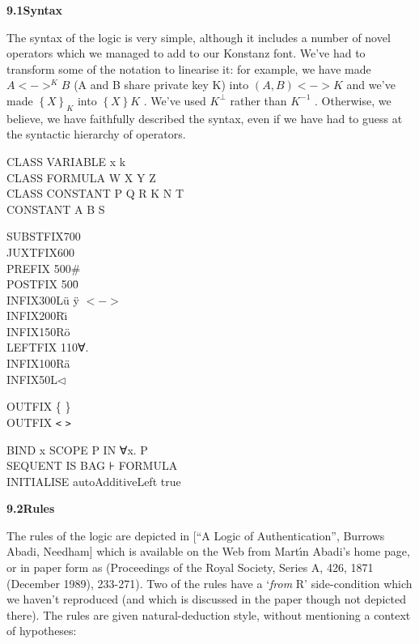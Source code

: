 \documentclass[11pt]{book}
\newcommand{\tab}{\hspace{5mm}}
\begin{document}
\textbf{{\large 9.1\tab Syntax}}


The syntax of the logic is very simple, although it includes a number of novel operators which we managed to add to our Konstanz font. We've had to transform some of the notation to linearise it: for example, we have made $A<->^{K} B$ (A and B share private key K) into $\left( A,B\right) <->K$ and we've made $\left\{ X\right\} _{K} $ into $\left\{ X\right\} K$ . We've used $K^{\bot } $ rather than $K^{-1} $ . Otherwise, we believe, we have faithfully described the syntax, even if we have had to guess at the syntactic hierarchy of operators.

CLASS VARIABLE x k\\
CLASS FORMULA W X Y Z\\
CLASS CONSTANT P Q R K N T\\
CONSTANT A B S

SUBSTFIX\tab 700\\
JUXTFIX\tab 600\\
PREFIX \tab 500\tab \#\\
POSTFIX \tab 500\tab \={}\\
INFIX\tab 300L\tab \"{u} \"{y} $<->$\\
INFIX\tab 200R\tab \"{\i}\\
INFIX\tab 150R\tab \"{o}\\
LEFTFIX \tab 110\tab ∀.\\
INFIX\tab 100R\tab \"{a}\\
INFIX\tab 50L\tab $\triangleleft$

OUTFIX \{ \}\\
OUTFIX \texttt{<} \texttt{>}

BIND x SCOPE P IN ∀x. P\\
SEQUENT IS BAG ⊦ FORMULA\\
INITIALISE autoAdditiveLeft true


\textbf{{\large 9.2\tab Rules}}


The rules of the logic are depicted in [``A Logic of Authentication'', Burrows Abadi, Needham] which is available on the Web from Mart\'{\i}n Abadi's home page, or in paper form as (Proceedings of the Royal Society, Series A, 426, 1871 (December 1989), 233-271). Two of the rules have a `\textit{from} R' side-condition which we haven't reproduced (and which is discussed in the paper though not depicted there). The rules are given natural-deduction style, without mentioning a context of hypotheses:\\
\end{document}
